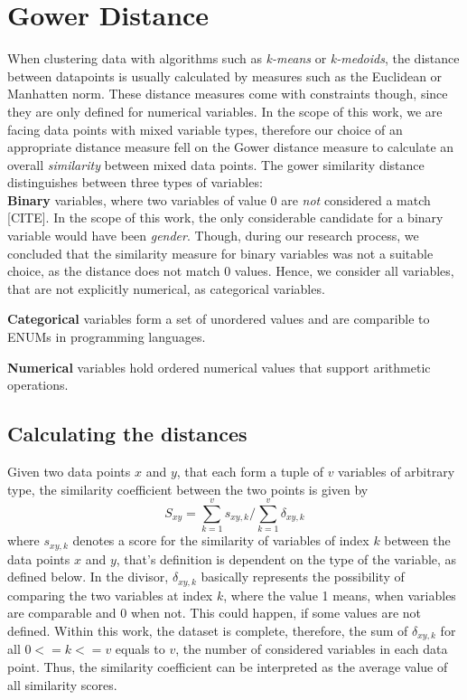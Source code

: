 \documentclass[11pt]{article}
\begin{document}
\section*{Gower Distance}

When clustering data with algorithms such as \textit{k-means} or \textit{k-medoids}, the distance between datapoints is usually calculated by measures such as the Euclidean or Manhatten norm. These distance measures come with constraints though, since they are only defined for numerical variables. In the scope of this work, we are facing data points with mixed variable types, therefore our choice of an appropriate distance measure fell on the Gower distance measure to calculate an overall \textit{similarity} between mixed data points. The gower similarity distance distinguishes between three types of variables:\\

\textbf{Binary} variables, where two variables of value 0 are \textit{not} considered a match [CITE]. In the scope of this work, the only considerable candidate for a binary variable would have been \textit{gender}. Though, during our research process, we concluded that the similarity measure for binary variables was not a suitable choice, as the distance does not match 0 values. Hence, we consider all variables, that are not explicitly numerical, as categorical variables.

\textbf{Categorical} variables form a set of unordered values and are comparible to ENUMs in programming languages.

\textbf{Numerical} variables hold ordered numerical values that support arithmetic operations.

\subsection*{Calculating the distances}

Given two data points $x$ and $y$, that each form a tuple of $v$ variables of arbitrary type, the similarity coefficient between the two points is given by
\begin{equation*}
  S_{xy} = \sum_{k=1}^{v} s_{xy,k} / \sum_{k=1}^{v} \delta_{xy,k} 
\end{equation*} 
where $s_{xy,k}$ denotes a score for the similarity of variables of index $k$ between the data points $x$ and $y$, that's definition is dependent on the type of the variable, as defined below. In the divisor, $\delta_{xy,k}$ basically represents the possibility of comparing the two variables at index $k$, where the value 1 means, when variables are comparable and 0 when not. This could happen, if some values are not defined. Within this work, the dataset is complete, therefore, the sum of $\delta_{xy,k}$ for all $0 <= k <= v$ equals to $v$, the number of considered variables in each data point. Thus, the similarity coefficient can be interpreted as the average value of all similarity scores.\\  
\end{document}
